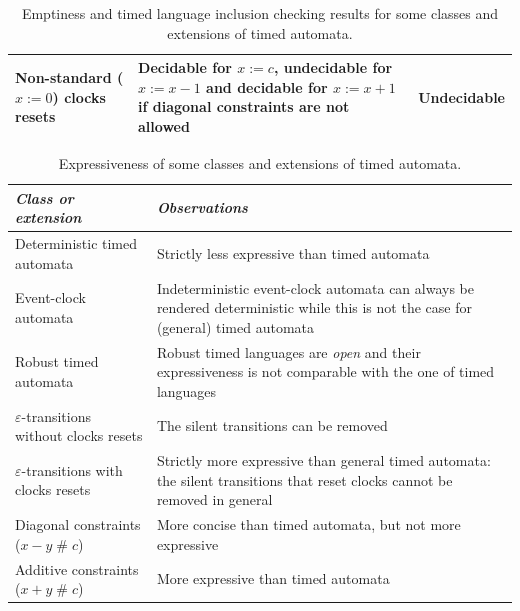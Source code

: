 \begin{table}[htbp]
\begin{tabular}{|p{5cm}|p{4.5cm}|p{2.5cm}|}
    \hline

    Non-standard ($x := 0$) clocks resets &
    Decidable for $x := c$, undecidable for $x := x -1$ and decidable for $x := x + 1$ if diagonal constraints are not allowed \cite{BDFP04} &
    Undecidable \\
    
    \hline

\end{tabular}
\caption{Emptiness and timed language inclusion checking results for some classes and extensions of timed automata.}
\label{tab:ta-classes-decidability}
\end{table}

\begin{table}[htbp]
\centering
\footnotesize
\begin{tabular}{|p{5cm}|p{7.5cm}|}

    \hline

    \textit{Class or extension} &
    \textit{Observations} \\

    \hline \hline

    Deterministic timed automata &
    Strictly less expressive than timed automata \\

    \hline

    Event-clock automata &
    Indeterministic event-clock automata can always be rendered deterministic while this is not the case for (general) timed automata \cite{RALF94} \\

    \hline

    Robust timed automata &
    Robust timed languages are \emph{open} and their expressiveness is not comparable with the one of timed languages \cite{RAPM04} \\

    \hline \hline

    $\varepsilon$-transitions without clocks resets &
    The silent transitions can be removed \cite{VDPG97} \\

    \hline

    $\varepsilon$-transitions with clocks resets &
    Strictly more expressive than general timed automata: the silent transitions that reset clocks cannot be removed in general \cite{VDPG97,BBVD+99,LSV:07:12} \\

    \hline

    Diagonal constraints ($x - y \;\#\; c$)&
    More concise than timed automata, but not more expressive \cite{BBVD+99} \\

    \hline

    Additive constraints ($x + y \;\#\; c$) &
    More expressive than timed automata \\

    \hline

\end{tabular}
\caption{Expressiveness of some classes and extensions of timed automata.}
\label{tab:ta-classes-expressiveness}
\end{table}

